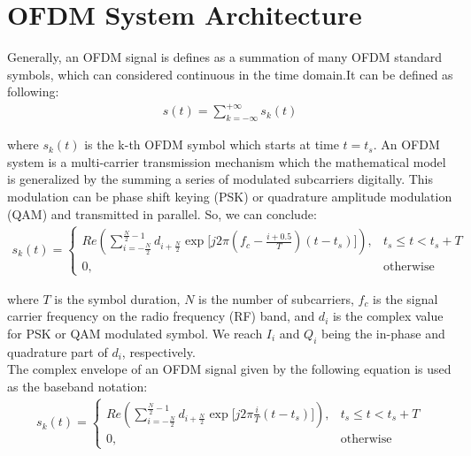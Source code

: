 \section{OFDM System Architecture}
Generally, an OFDM signal is defines as a summation of many OFDM standard symbols, which can considered continuous in the time domain.It can be defined as following:\\

\begin{equation} \label{general_form}
\begin{split}
s(t) =\sum\limits_{k=-\infty}^{+\infty} s_{k}(t)
\end{split}
\end{equation}

where $s_{k}(t)$ is the k-th OFDM symbol which starts at time $t= t_{s}$. An OFDM system is a multi-carrier transmission mechanism which the mathematical model is generalized by the summing a series of modulated subcarriers digitally. This modulation can be phase shift keying (PSK) or quadrature amplitude modulation (QAM) and transmitted in parallel. So, we can  conclude:\\
\begin{equation} \label{ofdm_digital_mod}
\begin{split}
s_{k}(t)=
\left\{
	\begin{array}{ll}
	Re\left( \sum\limits_{i=-\frac{N}{2}}^{\frac{N}{2}-1} d_{i+\frac{N}{2}} \exp\lbrack j2\pi(f_{c} - \frac{i+0.5}{T})(t- t_{s})\rbrack\right) , & t_{s}\le t < t_{s} + T\\
	0, & \mbox{otherwise}
	\end{array}
\right.
\end{split}
\end{equation}

where $T$ is the symbol duration, $N$ is the number of subcarriers, $f_{c}$ is the signal carrier
frequency on the radio frequency (RF) band, and $d_{i}$ is the complex value for PSK or QAM modulated symbol. We reach $I_{i}$ and $Q_{i}$ being the in-phase and quadrature part of $d_{i}$, respectively.\\
The complex envelope of an OFDM signal given by the following equation is used as the baseband notation:
\begin{equation} \label{ofdm_complex_env}
\begin{split}
s_{k}(t)=
\left\{
	\begin{array}{ll}
	Re\left( \sum\limits_{i=-\frac{N}{2}}^{\frac{N}{2}-1} d_{i+\frac{N}{2}} \exp\lbrack j2\pi\frac{i}{T}(t- t_{s})\rbrack\right) , & t_{s}\le t < t_{s} + T\\
	0, & \mbox{otherwise}
	\end{array}
\right.
\end{split}
\end{equation}

